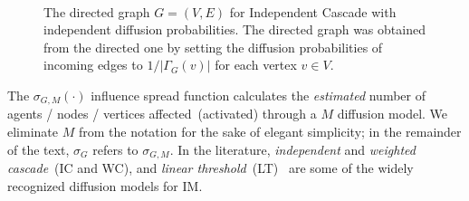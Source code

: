 \documentclass[10pt,journal,compsoc]{IEEEtran}
\begin{document}
\begin{figure}[!ht] 
    \centering
    \\%
  \caption{\protect{} 
The directed graph $G = (V, E)$ for Independent Cascade with independent diffusion probabilities. 
\protect{}
The directed graph was obtained from the directed one by setting the diffusion probabilities of incoming edges to $1 / |\Gamma_G(v)|$ for each vertex $v \in V$. 
  }
  \label{fig:xx} 
\end{figure}

The $\sigma_{G, M}(\cdot)$ influence spread function calculates the {\em estimated} number of agents / nodes / vertices affected~(activated) through a $M$ diffusion model. 
We eliminate $M$ from the notation for the sake of elegant simplicity; in the remainder of the text, $\sigma_{G}$ refers to $\sigma_{G, M}$.
In the literature, {\em independent} and {\em weighted cascade}~(IC and WC), and 
{\em linear threshold}~(LT)~\cite{kempe2003maximizing} are some of the widely recognized diffusion models for IM. 
\end{document}
